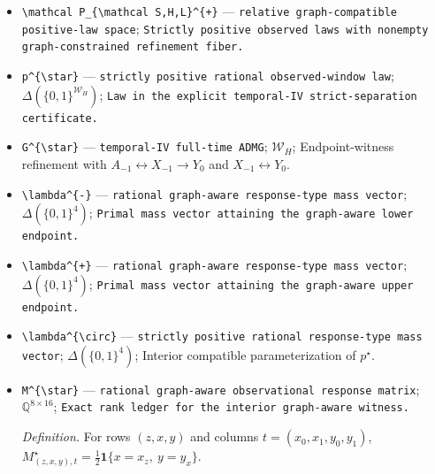 \documentclass{article}
\begin{document}
\begin{itemize}
  \par\smallskip\noindent\emph{Definition.} The exact minimum and maximum of \(q_H^{\mathrm{ord}}(\rho)\) over \(\mathfrak O_H(p)\).
  \item \texttt{\textbackslash{}\allowbreak{}mathcal P\_\allowbreak{}\{\textbackslash{}\allowbreak{}mathcal S,\allowbreak{}H,\allowbreak{}L\}\allowbreak{}\textasciicircum{}\{+\allowbreak{}\}\allowbreak{}} --- \texttt{relative graph-\allowbreak{}compatible positive-\allowbreak{}law space}; \texttt{Strictly positive observed laws with nonempty graph-\allowbreak{}constrained refinement fiber.}
  \item \texttt{p\textasciicircum{}\{\textbackslash{}\allowbreak{}star\}\allowbreak{}} --- \texttt{strictly positive rational observed-\allowbreak{}window law}; \(\Delta(\{0,1\}^{\mathcal W_H})\); \texttt{Law in the explicit temporal-\allowbreak{}IV strict-\allowbreak{}separation certificate.}
  \item \texttt{G\textasciicircum{}\{\textbackslash{}\allowbreak{}star\}\allowbreak{}} --- \texttt{temporal-\allowbreak{}IV full-\allowbreak{}time ADMG}; \(\mathcal W_H\); Endpoint-witness refinement with \(A_{-1}\leftrightarrow X_{-1}\to Y_0\) and \(X_{-1}\leftrightarrow Y_0\).
  \item \texttt{\textbackslash{}\allowbreak{}lambda\textasciicircum{}\{-\allowbreak{}\}\allowbreak{}} --- \texttt{rational graph-\allowbreak{}aware response-\allowbreak{}type mass vector}; \(\Delta(\{0,1\}^{4})\); \texttt{Primal mass vector attaining the graph-\allowbreak{}aware lower endpoint.}
  \item \texttt{\textbackslash{}\allowbreak{}lambda\textasciicircum{}\{+\allowbreak{}\}\allowbreak{}} --- \texttt{rational graph-\allowbreak{}aware response-\allowbreak{}type mass vector}; \(\Delta(\{0,1\}^{4})\); \texttt{Primal mass vector attaining the graph-\allowbreak{}aware upper endpoint.}
  \item \texttt{\textbackslash{}\allowbreak{}lambda\textasciicircum{}\{\textbackslash{}\allowbreak{}circ\}\allowbreak{}} --- \texttt{strictly positive rational response-\allowbreak{}type mass vector}; \(\Delta(\{0,1\}^{4})\); Interior compatible parameterization of \(p^{\star}\).
  \item \texttt{M\textasciicircum{}\{\textbackslash{}\allowbreak{}star\}\allowbreak{}} --- \texttt{rational graph-\allowbreak{}aware observational response matrix}; \(\mathbb Q^{8\times16}\); \texttt{Exact rank ledger for the interior graph-\allowbreak{}aware witness.}
  \par\smallskip\noindent\emph{Definition.} For rows \((z,x,y)\) and columns \(t=(x_0,x_1,y_0,y_1)\), \(M^{\star}_{(z,x,y),t}=\tfrac12\mathbf 1\{x=x_z,\ y=y_x\}\).

\end{itemize}
\end{document}
